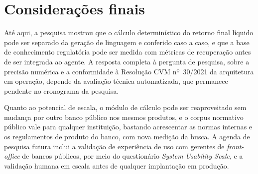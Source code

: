 
\section{Considerações finais}

Até aqui, a pesquisa mostrou que o cálculo determinístico do retorno final
líquido pode ser separado da geração de linguagem e conferido caso a caso, e
que a base de conhecimento regulatória pode ser medida com métricas de
recuperação antes de ser integrada ao agente. A resposta completa à pergunta de
pesquisa, sobre a precisão numérica e a conformidade à Resolução CVM
nº~30/2021 da arquitetura em operação, depende da avaliação técnica
automatizada, que permanece pendente no cronograma da pesquisa.

Quanto ao potencial de escala, o módulo de cálculo pode ser reaproveitado sem
mudança por outro banco público nos mesmos produtos, e o corpus normativo
público vale para qualquer instituição, bastando acrescentar as normas
internas e os regulamentos de produto do banco, com nova medição da busca. A
agenda de pesquisa futura inclui a validação de experiência de uso com
gerentes de \textit{front-office} de bancos públicos, por meio do questionário
\textit{System Usability Scale}, e a validação humana em escala antes de
qualquer implantação em produção.
